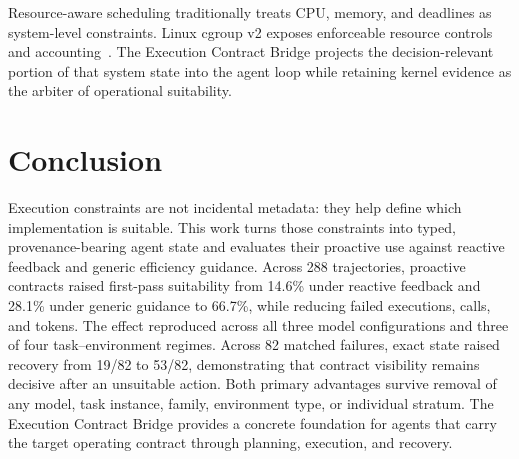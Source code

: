 \documentclass[sigconf,anonymous]{aamas}
\begin{document}
Resource-aware scheduling traditionally treats CPU, memory, and deadlines as
system-level constraints. Linux cgroup v2 exposes enforceable resource controls
and accounting~\cite{linuxcgroupv2}. The Execution Contract Bridge projects the
decision-relevant portion of that system state into the agent loop while retaining
kernel evidence as the arbiter of operational suitability.

\section{Conclusion}

Execution constraints are not incidental metadata: they help define which
implementation is suitable. This work turns those constraints into typed,
provenance-bearing agent state and evaluates their proactive use against reactive
feedback and generic efficiency guidance. Across 288 trajectories, proactive
contracts raised first-pass suitability from 14.6\% under reactive feedback and
28.1\% under generic guidance to 66.7\%, while reducing failed executions,
calls, and tokens. The effect reproduced across all three model configurations
and three of four task--environment regimes. Across 82 matched failures, exact
state raised recovery from 19/82 to 53/82, demonstrating that contract visibility
remains decisive after an unsuitable action. Both primary advantages survive
removal of any model, task instance, family, environment type, or individual
stratum. The Execution Contract Bridge provides a concrete foundation for agents
that carry the target operating contract through planning, execution, and recovery.

\balance


\end{document}
